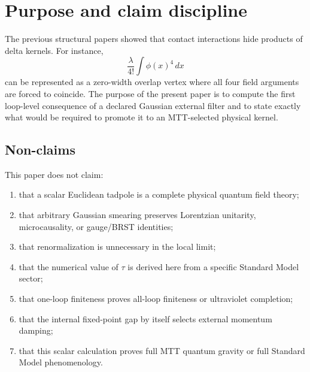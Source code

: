 \documentclass[11pt]{article}
\begin{document}
\tableofcontents

\section{Purpose and claim discipline}

The previous structural papers showed that contact interactions hide products of delta kernels. For instance,
\[
\frac{\lambda}{4!}\int \phi(x)^4\,dx
\]
can be represented as a zero-width overlap vertex where all four field arguments are forced
to coincide.  The purpose of the present paper is to compute the first loop-level consequence
of a declared Gaussian external filter and to state exactly what would be required to promote
it to an MTT-selected physical kernel.

\begin{center}
\end{center}

\subsection{Non-claims}

This paper does not claim:
\begin{enumerate}
\item that a scalar Euclidean tadpole is a complete physical quantum field theory;
\item that arbitrary Gaussian smearing preserves Lorentzian unitarity, microcausality, or gauge/BRST identities;
\item that renormalization is unnecessary in the local limit;
\item that the numerical value of \(\tau\) is derived here from a specific Standard Model sector;
\item that one-loop finiteness proves all-loop finiteness or ultraviolet completion;
\item that the internal fixed-point gap by itself selects external momentum damping;
\item that this scalar calculation proves full MTT quantum gravity or full Standard Model phenomenology.
\end{enumerate}
\end{document}
